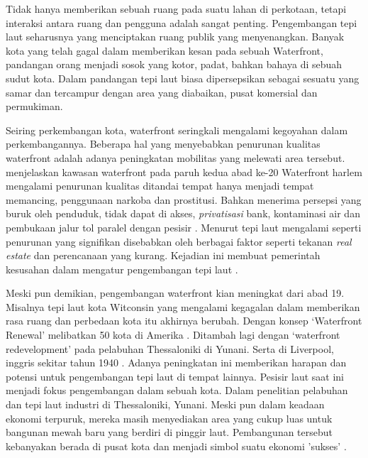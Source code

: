 \documentclass[../projects/thesis.tex]{subfiles}
\begin{document}
\begin{comment}
Menurut \cite{shamsuddin2013}, riverside merupakan ruang perkotaan yang harus terus berkembang. Kawasan inilah yang diberkahi dengan karakteristik dan perhatian khusus mengingat pentingnya air sebagai sumber kehidupan kota.
Pada area laut perkotaan, lomba untuk ruang waterfront, kebutuhan publik untuk mengakses pesisir laut dan mempertahankan biodiversity tepi laut sebagai sumber alami menjadi isu terhangat dalam kebijakan perkotaan \citep{breen1994waterfronts}.
\end{comment}
Tidak hanya memberikan sebuah ruang pada suatu lahan di perkotaan, tetapi interaksi antara ruang dan pengguna adalah sangat penting. Pengembangan tepi laut seharusnya yang menciptakan ruang publik yang menyenangkan. Banyak kota yang telah gagal dalam memberikan kesan pada sebuah Waterfront, pandangan orang menjadi sosok yang kotor, padat, bahkan bahaya di sebuah sudut kota. Dalam pandangan \cite{goodwin1999} tepi laut biasa dipersepsikan sebagai sesuatu yang samar dan tercampur dengan area yang diabaikan, pusat komersial dan permukiman.

Seiring perkembangan kota, waterfront seringkali mengalami kegoyahan dalam perkembangannya. Beberapa hal yang menyebabkan penurunan kualitas  waterfront adalah adanya peningkatan mobilitas yang melewati area tersebut\citep{richarda.lehmann1966}. \cite{ulam2009} menjelaskan kawasan waterfront pada paruh kedua abad ke-20 Waterfront harlem mengalami penurunan kualitas ditandai tempat hanya menjadi tempat memancing, penggunaan narkoba dan prostitusi. Bahkan menerima persepsi yang buruk oleh penduduk, tidak dapat di akses, \textit{privatisasi} bank, kontaminasi air dan pembukaan jalur tol paralel dengan pesisir \citep{shamsuddin2013}. Menurut \cite{benages2015revisiting} tepi laut mengalami seperti penurunan yang signifikan disebabkan oleh berbagai faktor seperti tekanan \textit{real estate} dan perencanaan yang kurang. Kejadian ini membuat pemerintah kesusahan dalam mengatur pengembangan tepi laut \citep{gripaios1999ports}.


Meski pun demikian, pengembangan waterfront kian meningkat dari abad 19. Misalnya tepi laut kota Witconsin yang mengalami kegagalan dalam memberikan rasa ruang dan perbedaan kota itu akhirnya berubah. Dengan konsep `Waterfront Renewal' melibatkan 50 kota di Amerika \citep{richarda.lehmann1966}. Ditambah lagi dengan `waterfront redevelopment' pada pelabuhan Thessaloniki di Yunani. Serta di Liverpool, inggris sekitar tahun 1940 \citep{couch2003city}. Adanya peningkatan ini memberikan harapan dan potensi untuk pengembangan tepi laut di tempat lainnya.
Pesisir laut saat ini menjadi fokus pengembangan dalam sebuah kota. Dalam penelitian pelabuhan dan tepi laut industri di Thessaloniki, Yunani. Meski pun dalam keadaan ekonomi terpuruk, mereka masih menyediakan area yang cukup luas untuk bangunan mewah baru yang berdiri di pinggir laut. Pembangunan tersebut kebanyakan berada di pusat kota dan menjadi simbol suatu ekonomi 'sukses' \citep{vayona2011}.
\end{document}
